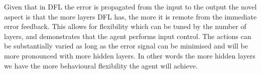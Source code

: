 \documentclass{llncs}
\begin{document}
Given that in DFL the error is propagated from the input to the output
the novel aspect is that the more layers DFL has, the more it is remote
from the immediate error feedback. This allows for flexibility which
can be tuned by the number of layers, and demonstrates that the agent
performs input control. The actions can be substantially varied as long as
the error signal can be minimised and will be more pronounced with
more hidden layers. In other words the more hidden layers we have the
more behavioural flexibility the agent will achieve.









\end{document}
